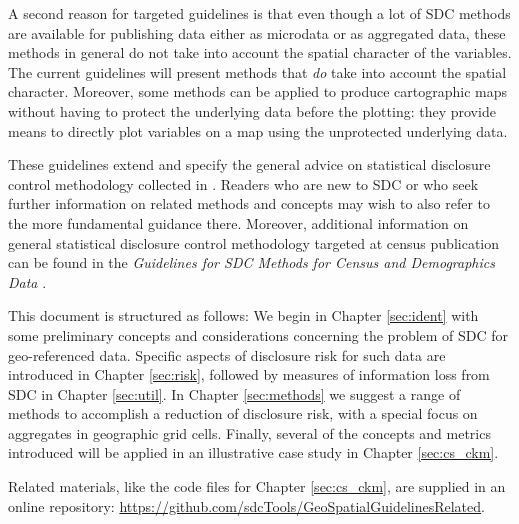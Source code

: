 A second reason for targeted guidelines is that even though a lot of SDC methods are available for publishing data either as microdata or as aggregated data, these methods in general do not take into account the spatial character of the variables. The current guidelines will present methods that \textit{do} take into account the spatial character. Moreover, some methods can be applied to produce cartographic maps without having to protect the underlying data before the plotting: they provide means to directly plot variables on a map using the unprotected underlying data.\bigskip

These guidelines extend and specify the general advice on statistical disclosure control methodology collected in \citet{HundepoolEtAl2024}. Readers who are new to SDC or who seek further information on related methods and concepts may wish to also refer to the more fundamental guidance there.
Moreover, additional information on general statistical disclosure control methodology targeted at census publication can be found in the \emph{Guidelines for SDC Methods for Census and Demographics Data} \citep{HundepoolEtAl2024}. \bigskip

This document is structured as follows: We begin in Chapter \ref{sec:ident} with some preliminary concepts and considerations concerning the problem of SDC for geo-referenced data. Specific aspects of disclosure risk for such data are introduced in Chapter \ref{sec:risk}, followed by measures of information loss from SDC in Chapter \ref{sec:util}. In Chapter \ref{sec:methods} we suggest a range of methods to accomplish a reduction of disclosure risk, with a special focus on aggregates in geographic grid cells. Finally, several of the concepts and metrics introduced will be applied in an illustrative case study in Chapter \ref{sec:cs_ckm}.\bigskip

Related materials, like the code files for Chapter \ref{sec:cs_ckm}, are supplied in an online repository:
\url{https://github.com/sdcTools/GeoSpatialGuidelinesRelated}.
